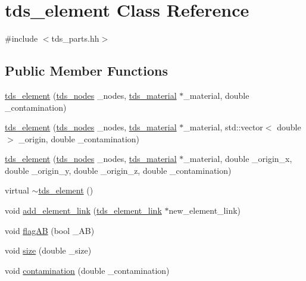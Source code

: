 \hypertarget{classtds__element}{\section{tds\-\_\-element Class Reference}
\label{classtds__element}
}


{\ttfamily \#include $<$tds\-\_\-parts.\-hh$>$}

\subsection*{Public Member Functions}
\begin{DoxyCompactItemize}
\item 
\hyperlink{classtds__element_abcecf7331b6e9eb8901abef93626573d}{tds\-\_\-element} (\hyperlink{tds__parts_8hh_ad445cf91d41fc0e37fcaf259adec00ef}{tds\-\_\-nodes} \-\_\-nodes, \hyperlink{classtds__material}{tds\-\_\-material} $\ast$\-\_\-material, double \-\_\-contamination)
\item 
\hyperlink{classtds__element_aa29190be28bc10a7cc057707532bca21}{tds\-\_\-element} (\hyperlink{tds__parts_8hh_ad445cf91d41fc0e37fcaf259adec00ef}{tds\-\_\-nodes} \-\_\-nodes, \hyperlink{classtds__material}{tds\-\_\-material} $\ast$\-\_\-material, std\-::vector$<$ double $>$ \-\_\-origin, double \-\_\-contamination)
\item 
\hyperlink{classtds__element_acc981290ffd87bad402d32c4508dc5f4}{tds\-\_\-element} (\hyperlink{tds__parts_8hh_ad445cf91d41fc0e37fcaf259adec00ef}{tds\-\_\-nodes} \-\_\-nodes, \hyperlink{classtds__material}{tds\-\_\-material} $\ast$\-\_\-material, double \-\_\-origin\-\_\-x, double \-\_\-origin\-\_\-y, double \-\_\-origin\-\_\-z, double \-\_\-contamination)
\item 
virtual \hyperlink{classtds__element_a209f4917125e72c36d3285980d983892}{$\sim$tds\-\_\-element} ()
\item 
void \hyperlink{classtds__element_a9b3c0e1088fb7ae6da03e8fc1bf9c383}{add\-\_\-element\-\_\-link} (\hyperlink{classtds__element__link}{tds\-\_\-element\-\_\-link} $\ast$new\-\_\-element\-\_\-link)
\item 
void \hyperlink{classtds__element_ab8eb795822ab7e1ea47b703e4f5f473a}{flag\-A\-B} (bool \-\_\-\-A\-B)
\item 
void \hyperlink{classtds__element_adb36fa3ae80584e3a4fe12cfdedf6db6}{size} (double \-\_\-size)
\item 
void \hyperlink{classtds__element_a2b3e86e827be59f63cb8d561a73d6983}{contamination} (double \-\_\-contamination)

\end{DoxyCompactItemize}
